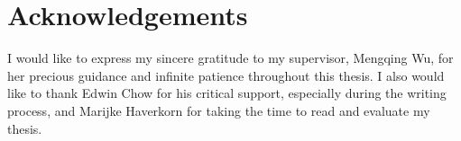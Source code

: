 \chapter*{Acknowledgements}

I would like to express my sincere gratitude to my supervisor, Mengqing Wu, for her precious guidance and infinite patience throughout this thesis. I also would like to thank Edwin Chow for his critical support, especially during the writing process, and Marijke Haverkorn for taking the time to read and evaluate my thesis.